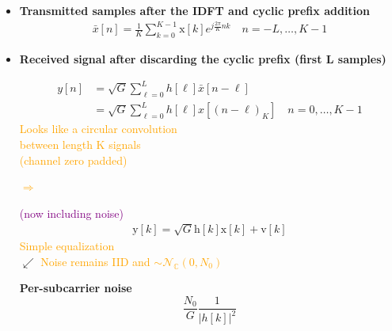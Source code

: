 \documentclass[a4paper, 12pt]{book}
\begin{document}
\begin{itemize}[label=\textcolor{red}{\small\faSquare}]
    \item \textbf{Transmitted samples after the IDFT and cyclic prefix addition}
    \begin{align*}
        \bar{x}[n] = \frac{1}{K} \sum_{k=0}^{K-1} \mathrm{x}[k] e^{j \frac{2\pi}{K} nk} \quad n = -L, \dots, K-1
    \end{align*}

    \item \textbf{Received signal after discarding the cyclic prefix (first L samples)}

    \noindent
    \begin{minipage}[t]{0.45\textwidth}
        \begin{align*}
            y[n] &= \sqrt{G} \sum_{\ell=0}^{L} h[\ell] \bar{x}[n-\ell] \\
            &= \sqrt{G} \sum_{\ell=0}^{L} h[\ell] x[(n-\ell)_K] \quad n=0, \dots, K-1
        \end{align*}
        \textcolor{orange}{\small Looks like a circular convolution \\ between length K signals \\ (channel zero padded)}
    \end{minipage}%
    \begin{minipage}[t]{0.1\textwidth}
        \centering
        \vspace{1.5cm}
        \textcolor{orange}{\Huge $\Rightarrow$}
    \end{minipage}%
    \begin{minipage}[t]{0.45\textwidth}
        \vspace{0.5cm}
        \textcolor{purple}{\small (now including noise)}
        \begin{align*}
            \mathrm{y}[k] = \sqrt{G} \mathrm{h}[k]\mathrm{x}[k] + \mathrm{v}[k]
        \end{align*}
        \textcolor{orange}{\small Simple equalization} \\
        \raggedleft
        \small $\swarrow$ \textcolor{orange}{\small Noise remains IID and $\sim \mathcal{N}_{\mathbb{C}}(0, N_0)$}
    \end{minipage}

    \vspace{1em}
    \begin{center}
        \colorbox{cyan!15}{
            \begin{minipage}{0.3\textwidth}
                \centering
                \small \textbf{Per-subcarrier noise}
                \[
                \frac{N_0}{G} \frac{1}{|h[k]|^2}
                \]
            \end{minipage}
        }
    \end{center}
\end{itemize}
\end{document}
